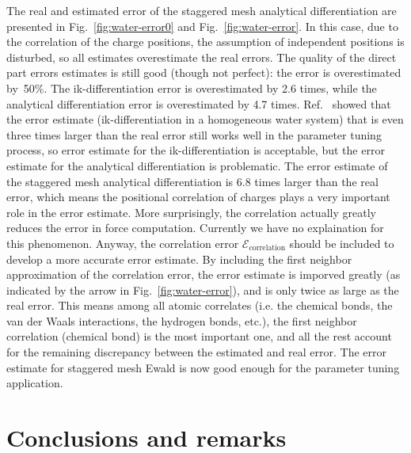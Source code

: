 \documentclass[aps,pre,preprint]{revtex4}
\begin{document}
The real and estimated error of the staggered mesh analytical
differentiation are presented in Fig.~\ref{fig:water-error0}
and Fig.~\ref{fig:water-error}.  In this
case, due to the correlation of the charge positions, the assumption
of independent positions is disturbed, so all estimates overestimate
the real errors.
The quality of the direct
part errors estimates is still good (though not perfect):
the error is overestimated by~50\%.
The ik-differentiation error is overestimated by 2.6 times,
while the analytical differentiation error is overestimated by 4.7 times.
Ref.~\cite{wang2010optimizing} showed that the error estimate
(ik-differentiation in a homogeneous water system) that
is even three times larger than the real error
still works well in the parameter tuning process, so 
error estimate for the ik-differentiation is acceptable, but the error
estimate for the analytical differentiation is problematic.
The error estimate of the staggered mesh analytical differentiation is 6.8 times
larger than the real error,
which means the
positional correlation of charges plays a very important role
in the error estimate. More surprisingly, the correlation
actually greatly reduces the error in force computation.
Currently we have no explaination for this phenomenon.
Anyway, the correlation error $\mathcal
E_{\textrm{correlation}}$ should be included to develop a more accurate error
estimate. 
By including the first neighbor approximation of the
correlation error, the error estimate is imporved greatly
(as indicated by the arrow in Fig.~\ref{fig:water-error}), and is only
twice as large as the real error.
This means among all atomic
correlates (i.e. the chemical bonds, the van der Waals interactions,
the hydrogen bonds, etc.), the first neighbor correlation (chemical bond)
is the most important one, and all
the rest account for the remaining discrepancy between the estimated and real
error.
The error estimate for staggered mesh Ewald is now good enough
for the parameter tuning application.

\section{Conclusions and remarks}
\end{document}
